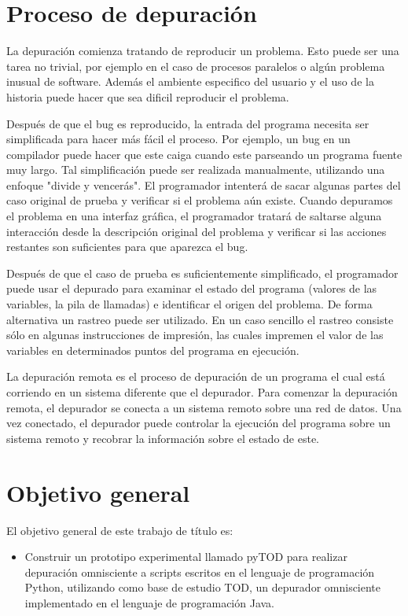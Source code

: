 \documentclass[12pt,legalpaper]{report}
\begin{document}
	\section{Proceso de depuración}

La depuración comienza tratando de reproducir un problema.  Esto puede ser una tarea no trivial, por ejemplo en el caso de procesos paralelos o algún problema inusual de software.  Además el ambiente especifico del usuario y el uso de la historia puede hacer que sea dificil reproducir el problema.


Después de que el bug es reproducido, la entrada del programa necesita ser simplificada para hacer más fácil el proceso.  Por ejemplo, un bug en un compilador puede hacer que este caiga cuando este parseando un programa fuente muy largo.  Tal simplificación puede ser realizada manualmente, utilizando una enfoque "divide y vencerás".  El programador intenterá de sacar algunas partes del caso original de prueba y verificar si el problema aún existe.  Cuando depuramos el problema en una interfaz gráfica, el programador tratará de saltarse alguna interacción  desde la descripción original del problema y verificar si las acciones restantes son suficientes para que aparezca el bug.


Después de que el caso de prueba es suficientemente simplificado, el programador puede usar el depurado para examinar el estado del programa (valores de las variables, la pila de llamadas) e identificar el origen del problema.  De forma alternativa un rastreo puede ser utilizado.  En un caso sencillo el rastreo consiste sólo en algunas instrucciones de impresión, las cuales impremen el valor de las variables en determinados puntos del programa en ejecución.


La depuración remota es el proceso de depuración de un programa el cual está corriendo en un sistema diferente que el depurador.  Para comenzar la depuración remota, el depurador se conecta a un sistema remoto sobre una red de datos.  Una vez conectado, el depurador puede controlar la ejecución del programa  sobre un sistema remoto y recobrar la información sobre el estado de este.

	\section{Objetivo general}

El objetivo general de este trabajo de título es:
\begin{itemize}
\item Construir un prototipo experimental llamado pyTOD para realizar depuración omnisciente a scripts escritos en el lenguaje de programación Python, utilizando como base de estudio TOD, un depurador omnisciente implementado en el lenguaje de programación Java.
\end{itemize}
\end{document}
